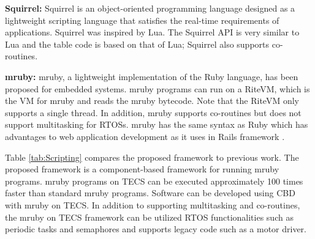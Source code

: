 \documentclass[a4j,12pt,oneside,openany,english]{jsbook}
\begin{document}
{\bf Squirrel:}
Squirrel is an object-oriented programming language designed as a lightweight scripting language that satisfies the real-time requirements of applications.
Squirrel was inspired by Lua.
The Squirrel API is very similar to Lua and the table code is based on that of Lua; Squirrel also supports co-routines.

{\bf mruby:}
mruby, a lightweight implementation of the Ruby language, has been proposed for embedded systems.
mruby programs can run on a RiteVM, which is the VM for mruby and reads the mruby bytecode.
Note that the RiteVM only supports a single thread.
In addition, mruby supports co-routines but does not support multitasking for RTOSs.
mruby has the same syntax as Ruby which has advantages to web application development as it uses in Rails framework \cite{url:rubyonrails}.

Table \ref{tab:Scripting} compares the proposed framework to previous work.
The proposed framework is a component-based framework for running mruby programs.
mruby programs on TECS can be executed approximately 100 times faster than standard mruby programs.
Software can be developed using CBD with mruby on TECS.
In addition to supporting multitasking and co-routines, the mruby on TECS framework can be utilized RTOS functionalities such as periodic tasks and semaphores and supports legacy code such as a motor driver.
\end{document}
